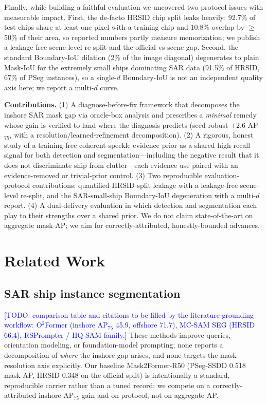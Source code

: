 \documentclass[journal]{IEEEtran}
\newcommand{\TODO}[1]{\textcolor{blue}{[TODO: #1]}}
\begin{document}
Finally, while building a faithful evaluation we uncovered two protocol issues with measurable impact. First, the de-facto HRSID chip split leaks heavily: 92.7\% of test chips share at least one pixel with a training chip and 10.8\% overlap by $\ge$50\% of their area, so reported numbers partly measure memorization; we publish a leakage-free scene-level re-split and the official-vs-scene gap. Second, the standard Boundary-IoU dilation (2\% of the image diagonal) degenerates to plain Mask-IoU for the extremely small ships dominating SAR data (91.5\% of HRSID, 67\% of PSeg instances), so a single-$d$ Boundary-IoU is not an independent quality axis here; we report a multi-$d$ curve.

\noindent\textbf{Contributions.} (1) A diagnose-before-fix framework that decomposes the inshore SAR mask gap via oracle-box analysis and prescribes a \emph{minimal} remedy whose gain is verified to land where the diagnosis predicts (seed-robust $+2.6$ AP$_{75}$, with a resolution/learned-refinement decomposition). (2) A rigorous, honest study of a training-free coherent-speckle evidence prior as a shared high-recall signal for both detection and segmentation---including the negative result that it does not discriminate ship from clutter---each evidence use paired with an evidence-removed or trivial-prior control. (3) Two reproducible evaluation-protocol contributions: quantified HRSID-split leakage with a leakage-free scene-level re-split, and the SAR-small-ship Boundary-IoU degeneration with a multi-$d$ report. (4) A dual-delivery evaluation in which detection and segmentation each play to their strengths over a shared prior. We do not claim state-of-the-art on aggregate mask AP; we aim for correctly-attributed, honestly-bounded advances.

\section{Related Work}
\subsection{SAR ship instance segmentation}
\TODO{comparison table and citations to be filled by the literature-grounding workflow: O$^2$Former (inshore AP$_{75}$ 45.9, offshore 71.7), MC-SAM SEG (HRSID 66.4), RSPrompter / HQ-SAM family.} These methods improve queries, orientation modeling, or foundation-model prompting; none reports a decomposition of \emph{where} the inshore gap arises, and none targets the mask-resolution axis explicitly. Our baseline Mask2Former-R50 (PSeg-SSDD 0.518 mask AP, HRSID 0.348 on the official split) is intentionally a standard, reproducible carrier rather than a tuned record; we compete on a correctly-attributed inshore AP$_{75}$ gain and on protocol, not on aggregate AP.
\end{document}
